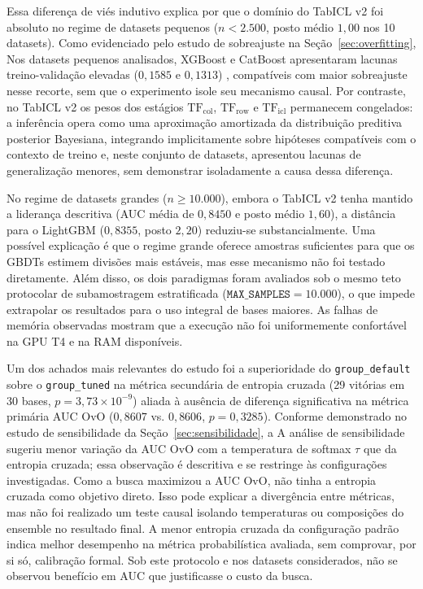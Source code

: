 \documentclass[11pt,a4paper]{article}
\begin{document}
Essa diferença de viés indutivo explica por que o domínio do TabICL v2 foi absoluto no regime de datasets pequenos ($n < 2.500$, posto médio $1{,}00$ nos 10 datasets). Como evidenciado pelo estudo de sobreajuste na Seção~\ref{sec:overfitting}, Nos datasets pequenos analisados, XGBoost e CatBoost apresentaram lacunas treino-validação elevadas ($0{,}1585$ e $0{,}1313$) , compatíveis com maior sobreajuste nesse recorte, sem que o experimento isole seu mecanismo causal. Por contraste, no TabICL v2 os pesos dos estágios $\mathrm{TF}_{\mathrm{col}}$, $\mathrm{TF}_{\mathrm{row}}$ e $\mathrm{TF}_{\mathrm{icl}}$ permanecem congelados: a inferência opera como uma aproximação amortizada da distribuição preditiva posterior Bayesiana, integrando implicitamente sobre hipóteses compatíveis com o contexto de treino e, neste conjunto de datasets, apresentou lacunas de generalização menores, sem demonstrar isoladamente a causa dessa diferença.

No regime de datasets grandes ($n \ge 10.000$), embora o TabICL v2 tenha mantido a liderança descritiva (AUC média de $0{,}8450$ e posto médio $1{,}60$), a distância para o LightGBM ($0{,}8355$, posto $2{,}20$) reduziu-se substancialmente. Uma possível explicação é que o regime grande oferece amostras suficientes para que os GBDTs estimem divisões mais estáveis, mas esse mecanismo não foi testado diretamente. Além disso, os dois paradigmas foram avaliados sob o mesmo teto protocolar de subamostragem estratificada ($\texttt{MAX\_SAMPLES} = 10.000$), o que impede extrapolar os resultados para o uso integral de bases maiores. As falhas de memória observadas mostram que a execução não foi uniformemente confortável na GPU T4 e na RAM disponíveis.

Um dos achados mais relevantes do estudo foi a superioridade do \texttt{group\_default} sobre o \texttt{group\_tuned} na métrica secundária de entropia cruzada (29 vitórias em 30 bases, $p = 3{,}73 \times 10^{-9}$) aliada à ausência de diferença significativa na métrica primária AUC OvO ($0{,}8607$ vs. $0{,}8606$, $p = 0{,}3285$). Conforme demonstrado no estudo de sensibilidade da Seção~\ref{sec:sensibilidade}, a A análise de sensibilidade sugeriu menor variação da AUC OvO com a temperatura de softmax $\tau$ que da entropia cruzada; essa observação é descritiva e se restringe às configurações investigadas. Como a busca maximizou a AUC OvO, não tinha a entropia cruzada como objetivo direto. Isso pode explicar a divergência entre métricas, mas não foi realizado um teste causal isolando temperaturas ou composições do ensemble no resultado final. A menor entropia cruzada da configuração padrão indica melhor desempenho na métrica probabilística avaliada, sem comprovar, por si só, calibração formal. Sob este protocolo e nos datasets considerados, não se observou benefício em AUC que justificasse o custo da busca.
\end{document}
